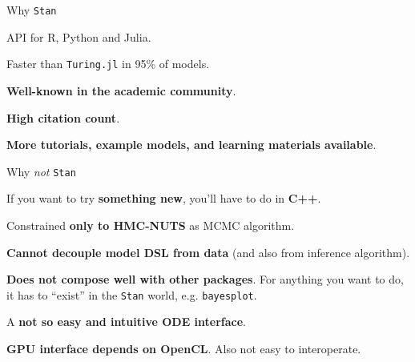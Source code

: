 \begin{frame}{Why \texttt{Stan}}
	\begin{vfilleditems}
		\item API for R, Python and Julia.
		\item Faster than \texttt{Turing.jl} in 95\% of models.
		\item \textbf{Well-known in the academic community}.
		\item \textbf{High citation count}.
		\item \textbf{More tutorials, example models, and learning materials available}.
	\end{vfilleditems}
\end{frame}

\begin{frame}{Why \textit{not} \texttt{Stan}}
	\begin{vfilleditems}
		\item If you want to try \textbf{something new}, you'll have to do in \textbf{C++}.
		\item Constrained \textbf{only to HMC-NUTS} as MCMC algorithm.
		\item \textbf{Cannot decouple model DSL from data} (and also from inference algorithm).
		\item \textbf{Does not compose well with other packages}.
		For anything you want to do, it has to ``exist'' in the \texttt{Stan} world,
		e.g. \texttt{bayesplot}.
		\item A \textbf{not so easy and intuitive ODE interface}.
		\item \textbf{GPU interface depends on OpenCL}.
		Also not easy to interoperate.
	\end{vfilleditems}
\end{frame}
